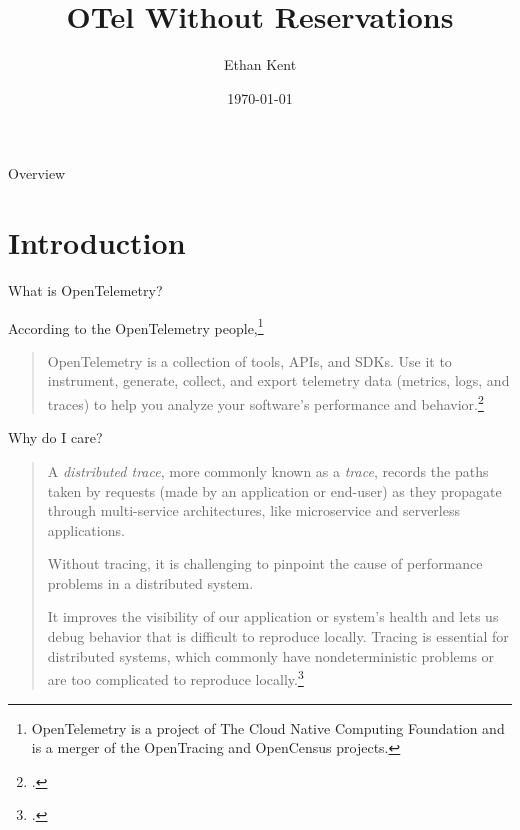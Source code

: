 \documentclass[aspectratio=169]{beamer}
\title{OTel Without Reservations}
\author{Ethan Kent}
\date{\today}
\begin{document}
\begin{frame}
  \titlepage
\end{frame}

\begin{frame}{Overview}
  \tableofcontents
\end{frame}

\section{Introduction}
\begin{frame}{What is OpenTelemetry?}

  According to the OpenTelemetry people,\footnote{OpenTelemetry is a project of
    The Cloud Native Computing Foundation and is a merger of the OpenTracing and
    OpenCensus projects.}

  \vspace{1em}

  \begin{quote}
    OpenTelemetry is a collection of tools, APIs, and SDKs. Use it to
    instrument, generate, collect, and export telemetry data (metrics, logs, and
    traces) to help you analyze your software's performance and
    behavior.\footcite{otel-site}
  \end{quote}
\end{frame}

\begin{frame}{Why do I care?}
  \begin{quote}

    A \emph{distributed trace}, more commonly known as a \emph{trace}, records
    the paths taken by requests (made by an application or end-user) as they
    propagate through multi-service architectures, like microservice and
    serverless applications.

    \vspace{0.618em}

    Without tracing, it is challenging to pinpoint the cause of performance
    problems in a distributed system.

    \vspace{0.618em}

    It improves the visibility of our application or system's health and lets us
    debug behavior that is difficult to reproduce locally. Tracing is essential
    for distributed systems, which commonly have nondeterministic problems or are
    too complicated to reproduce locally.\footcite{otel-dist-trace}

  \end{quote}
\end{frame}
\end{document}
